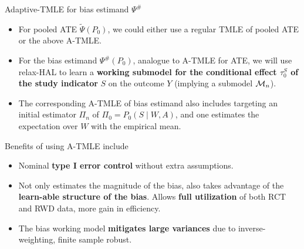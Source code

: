 \documentclass[t]{beamer}
\begin{document}
\begin{frame}{Adaptive-TMLE for bias estimand $\Psi^{\#}$}
\begin{itemize}
\item For pooled ATE $\tilde{\Psi}(P_0)$, we  could either use a regular TMLE of pooled ATE or the above A-TMLE.
\item For the bias estimand $\Psi^{\#}(P_0)$, analogue to A-TMLE for ATE,  we will use relax-HAL to learn a \textbf{working submodel for the conditional effect $\tau^S_0$ of the study indicator} $S$ on the outcome $Y$ (implying a submodel ${\cal M}_n$). 
\item The corresponding A-TMLE of bias estimand also includes targeting an initial estimator $\Pi_n$ of $\Pi_0=P_0(S\mid W,A)$, and one estimates the expectation over $W$ with the empirical mean. 
\end{itemize}
\end{frame}

\begin{frame}{Benefits of using A-TMLE include}
\begin{itemize}
\item Nominal \textbf{type I error control} without extra assumptions.
\item Not only estimates the magnitude of the bias, also takes advantage of the \textbf{learn-able structure of the bias}. Allows \textbf{full utilization} of both RCT and RWD data, more gain in efficiency.
\item The bias working model \textbf{mitigates large variances} due to inverse-weighting, finite sample robust.
\end{itemize}
\end{frame}

\end{document}

